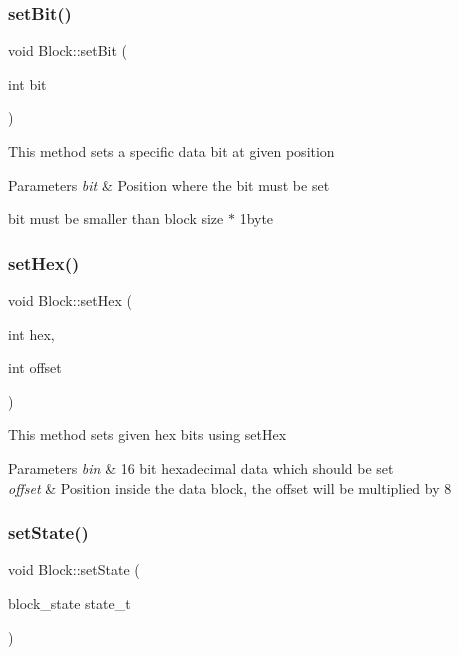 \subsubsection{\texorpdfstring{set\+Bit()}{setBit()}}
{\footnotesize\ttfamily void Block\+::set\+Bit (\begin{DoxyParamCaption}\item[{int}]{bit }\end{DoxyParamCaption})}

This method sets a specific data bit at given position


\begin{DoxyParams}{Parameters}
{\em bit} & Position where the bit must be set\\
\hline
\end{DoxyParams}
bit must be smaller than block size $\ast$ 1byte \mbox{\label{classcore_1_1logic_1_1_block_ab7c61557660651b8afb417ac6fff8418}} 
\subsubsection{\texorpdfstring{set\+Hex()}{setHex()}}
{\footnotesize\ttfamily void Block\+::set\+Hex (\begin{DoxyParamCaption}\item[{int}]{hex,  }\item[{int}]{offset }\end{DoxyParamCaption})}

This method sets given hex bits using set\+Hex


\begin{DoxyParams}{Parameters}
{\em bin} & 16 bit hexadecimal data which should be set\\
\hline
{\em offset} & Position inside the data block, the offset will be multiplied by 8 \\
\hline
\end{DoxyParams}
\mbox{\label{classcore_1_1logic_1_1_block_a2568d052f60f1c8fb59cc099bb8ba12b}} 
\subsubsection{\texorpdfstring{set\+State()}{setState()}}
{\footnotesize\ttfamily void Block\+::set\+State (\begin{DoxyParamCaption}\item[{block\+\_\+state}]{state\+\_\+t }\end{DoxyParamCaption})}


